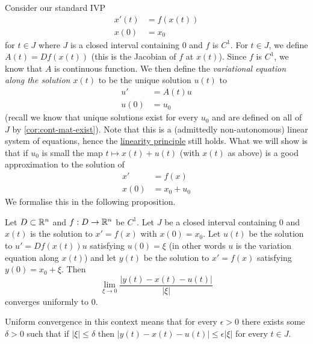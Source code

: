 Consider our standard IVP
\begin{align*}
    x'(t) &= f(x(t))\\
    x(0) &= x_0
\end{align*}
for $t \in J$ where $J$ is a closed interval containing 0 and $f$ is $C^1$. For $t \in J$, we define $A(t) = Df(x(t))$ (this is the Jacobian of $f$ at $x(t)$). Since $f$ is $C^1$, we know that $A$ is continuous function. We then define the \textit{variational equation along the solution $x(t)$} to be the unique solution $u(t)$ to
\begin{align*}
    u' &= A(t)u\\
    u(0) &= u_0
\end{align*}
(recall we know that unique solutions exist for every $u_0$ and are defined on all of $J$ by \autoref{cor:cont-mat-exist}). Note that this is a (admittedly non-autonomous) linear system of equations, hence the \hyperref[sec:superposition-principle]{linearity principle} still holds. What we will show is that if $u_0$ is small the map $t \mapsto x(t) + u(t)$ (with $x(t)$ as above) is a good approximation to the solution of
\begin{align*}
    x' &= f(x)\\
    x(0) &= x_0 + u_0
\end{align*} 
We formalise this in the following proposition.
\begin{proposition}\label{prop:approx-solns}
    Let $D \subset \mathbb{R}^n$ and $f: D \to \mathbb{R}^n$ be $C^1$.
    Let $J$ be a closed interval containing 0 and $x(t)$ is the solution to $x' = f(x)$ with $x(0) = x_0$. Let $u(t)$ be the solution to $u' = Df(x(t)) u$ satisfying $u(0) = \xi$ (in other words $u$ is the variation equation along $x(t)$) and let $y(t)$ be the solution to $x' = f(x)$ satisfying $y(0) = x_0 + \xi$. Then
    $$ \lim_{\xi \to 0} \frac{|y(t) - x(t) - u(t)|}{|\xi|} $$
    converges uniformly to 0.
\end{proposition}
\begin{remark}
    Uniform convergence in this context means that for every $\epsilon > 0$ there exists some $\delta > 0$ such that if $|\xi| \leq \delta$ then $|y(t) - x(t) - u(t)| \leq \epsilon|\xi|$ for every $t \in J$.
\end{remark}
